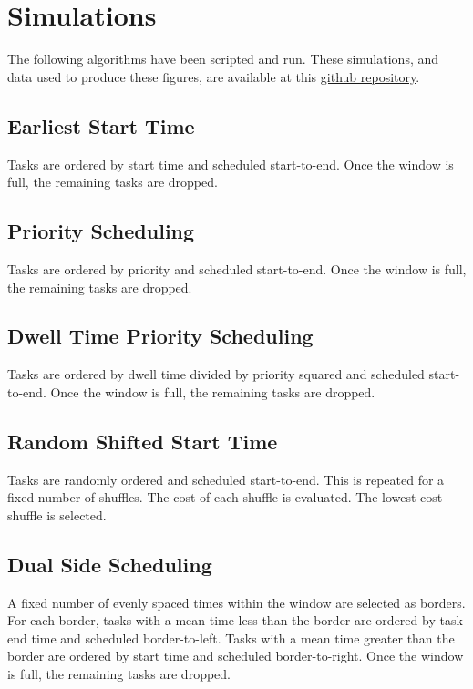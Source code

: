 \documentclass[conference]{IEEEtran}
\begin{document}
\section{Simulations}

The following algorithms have been scripted and run.
These simulations, and data used to produce these figures, are available at this \href{https://github.com/navh/radar-scheduling/tree/main/data}{github repository}.
\subsection{Earliest Start Time}

Tasks are ordered by start time and scheduled start-to-end.
Once the window is full, the remaining tasks are dropped.

\subsection{Priority Scheduling}

Tasks are ordered by priority and scheduled start-to-end.
Once the window is full, the remaining tasks are dropped.

\subsection{Dwell Time Priority Scheduling}

Tasks are ordered by dwell time divided by priority squared and scheduled start-to-end.
Once the window is full, the remaining tasks are dropped.

\subsection{Random Shifted Start Time}

Tasks are randomly ordered and scheduled start-to-end.
This is repeated for a fixed number of shuffles.
The cost of each shuffle is evaluated.
The lowest-cost shuffle is selected.

\subsection{Dual Side Scheduling}

A fixed number of evenly spaced times within the window are selected as borders.
For each border, tasks with a mean time less than the border are ordered by task end time and scheduled border-to-left.
Tasks with a mean time greater than the border are ordered by start time and scheduled border-to-right.
Once the window is full, the remaining tasks are dropped.
\end{document}
